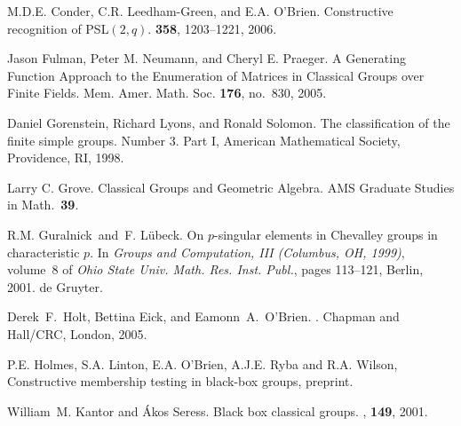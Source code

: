 \documentclass[12pt]{article}
\begin{document}
\begin{thebibliography}{10}


M.D.E. Conder, C.R. Leedham-Green, and E.A. O'Brien.
\newblock Constructive recognition of PSL$(2, q)$.
 {\bf 358}, 1203--1221, 2006.

Jason Fulman, Peter M. Neumann, and Cheryl E. Praeger.
A Generating Function Approach to the Enumeration
of Matrices in Classical Groups over Finite Fields.
Mem. Amer. Math. Soc. {\bf 176}, no.\ 830, 2005.

Daniel Gorenstein, Richard Lyons, and  Ronald Solomon.
The classification of the finite simple groups. Number 3. Part I,
American Mathematical Society, Providence, RI, 1998. 

Larry C. Grove. Classical Groups and Geometric Algebra.
AMS Graduate Studies in Math.\ {\bf 39}.

R.M. Guralnick\ and\ F. L\"ubeck.
 On $p$-singular elements in Chevalley groups in characteristic $p$.
\newblock In {\em Groups and Computation, III (Columbus, OH, 1999)}, volume~8
  of {\em Ohio State Univ. Math. Res. Inst. Publ.}, pages 113--121,
Berlin, 2001. de Gruyter.

Derek~F.\ Holt, Bettina Eick, and Eamonn~A.\ O'Brien.
.
\newblock Chapman and Hall/CRC, London, 2005.

 P.E. Holmes, S.A. Linton, E.A. O'Brien, A.J.E. Ryba and
R.A. Wilson, Constructive membership testing in black-box
groups, preprint.

William~M. Kantor and {\'A}kos Seress.
\newblock Black box classical groups.
, {\bf 149}, 2001.
                             
                                                                                

\end{thebibliography}
\end{document}

